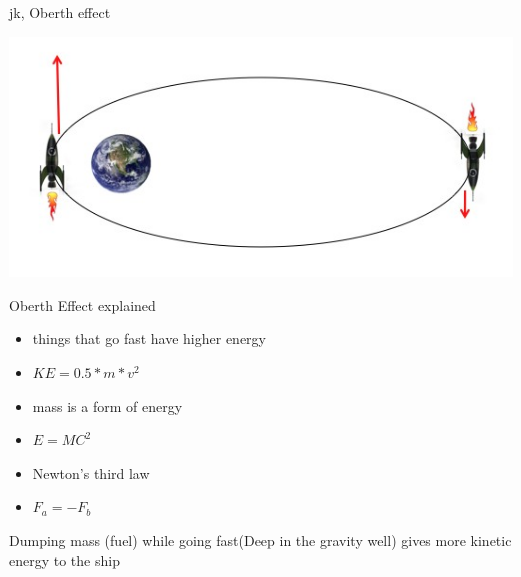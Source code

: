 \begin{frame}[t]{jk, Oberth effect}
    \begin{block}{}
        \includegraphics[width=\textwidth]{images/obert_effect}
    \end{block}
\end{frame}
\begin{frame}[t]{Oberth Effect explained}
    \begin{block}{}
        \begin{itemize}
            \item things that go fast have higher energy
            \item $KE = 0.5 * m * v^2$
        \end{itemize}
    \end{block}
    \begin{block}{}
        \begin{itemize}
            \item mass is a form of energy
            \item $E = MC^2$
        \end{itemize}
    \end{block}
    \begin{block}{}
        \begin{itemize}
            \item Newton's third law
            \item $F_a = -F_b$
        \end{itemize}
    \end{block}
    \begin{block}{}
        Dumping mass (fuel) while going fast(Deep in the gravity well) gives more kinetic energy to the ship
    \end{block}
\end{frame}
